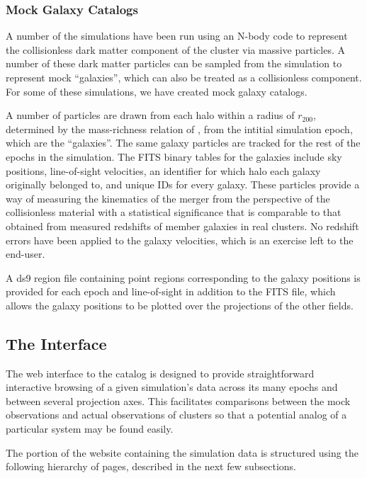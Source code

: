 \documentclass{emulateapj}
\begin{document}
\subsubsection{Mock Galaxy Catalogs}\label{sec:galaxies}

A number of the simulations have been run using an N-body code to represent the collisionless dark matter component of the cluster via massive particles. A number of these dark matter particles can be sampled from the simulation to represent mock ``galaxies'', which can also be treated as a collisionless component. For some of these simulations, we have created mock galaxy catalogs.

A number of particles are drawn from each halo within a radius of $r_{200}$, determined by the mass-richness relation of \citet{for14}, from the intitial simulation epoch, which are the ``galaxies''. The same galaxy particles are tracked for the rest of the epochs in the simulation. The FITS binary tables for the galaxies include sky positions, line-of-sight velocities, an identifier for which halo each galaxy originally belonged to, and unique IDs for every galaxy. These particles provide a way of measuring the kinematics of the merger from the perspective of the collisionless material with a statistical significance that is comparable to that obtained from measured redshifts of member galaxies in real clusters. No redshift errors have been applied to the galaxy velocities, which is an exercise left to the end-user.

A ds9 region file containing point regions corresponding to the galaxy positions is provided for each epoch and line-of-sight in addition to the FITS file, which allows the galaxy positions to be plotted over the projections of the other fields.

\subsection{The Interface}\label{sec:interface}

The web interface to the catalog is designed to provide straightforward interactive browsing of a given simulation's data across its many epochs and between several projection axes. This facilitates comparisons between the mock observations and actual observations of clusters so that a potential analog of a particular system may be found easily.

The portion of the website containing the simulation data is structured using the following hierarchy of pages, described in the next few subsections.
\end{document}
